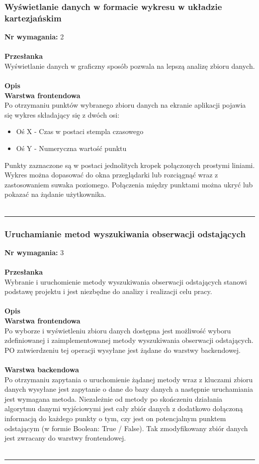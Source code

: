 \documentclass[eng,printmode]{mgr}
\begin{document}
\subsubsection{Wyświetlanie danych w formacie wykresu w układzie kartezjańskim}
\textbf{Nr wymagania:} 2
\\\\
\textbf{Przesłanka}\\
Wyświetlanie danych w graficzny sposób pozwala na lepszą analizę zbioru danych.
\\\\
\textbf{Opis}\\
\textbf{Warstwa frontendowa} \\
Po otrzymaniu punktów wybranego zbioru danych na ekranie aplikacji pojawia się wykres składający się z dwóch osi:
\begin{itemize}
  \item Oś X - Czas w postaci stempla czasowego
  \item Oś Y - Numeryczna wartość punktu 
\end{itemize}
Punkty zaznaczone są w postaci jednolitych kropek połączonych prostymi liniami. Wykres można dopasować do okna przeglądarki lub rozciągnąć wraz z zastosowaniem suwaka poziomego. Połączenia między punktami można ukryć lub pokazać na żądanie użytkownika.
\\\\\noindent\rule{\textwidth}{2pt}
\subsubsection{Uruchamianie metod wyszukiwania obserwacji odstających}
\textbf{Nr wymagania:} 3
\\\\
\textbf{Przesłanka}\\
Wybranie i uruchomienie metody wyszukiwania obserwacji odstających stanowi podstawę projektu i jest niezbędne do analizy i realizacji celu pracy.
\\\\
\textbf{Opis}\\
\textbf{Warstwa frontendowa}\\
Po wyborze i wyświetleniu zbioru danych dostępna jest możliwość wyboru zdefiniowanej i zaimplementowanej metody wyszukiwania obserwacji odstających. PO zatwierdzeniu tej operacji wysyłane jest żądane do warstwy backendowej.
\\\\
\textbf{Warstwa backendowa}\\
Po otrzymaniu zapytania o uruchomienie żądanej metody wraz z kluczami zbioru danych wysyłane jest zapytanie o dane do bazy danych a następnie uruchamiania jest wymagana metoda. Niezależnie od metody po skończeniu działania algorytmu danymi wyjściowymi jest cały zbiór danych z dodatkowo dołączoną informacją do każdego punkty o tym, czy jest on potencjalnym punktem odstającym (w formie Boolean: True / False). Tak zmodyfikowany zbiór danych jest zwracany do warstwy frontendowej.
\\\\\noindent\rule{\textwidth}{2pt}
\end{document}
